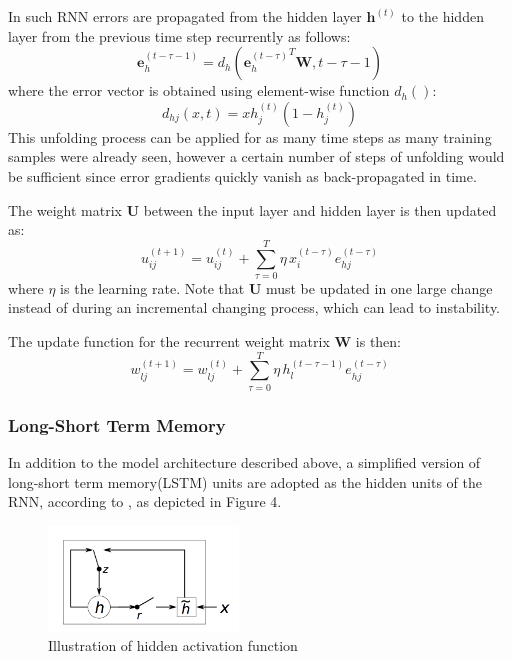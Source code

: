 \documentclass[11pt,letterpaper]{article}
\begin{document}
In such RNN errors are propagated from the hidden layer $\mathbf{h}^{(t)}$ to the hidden layer from the previous time step recurrently as follows:
\begin{equation}
\mathbf{e}_h^{(t-\tau-1)} = d_h ({\mathbf{e}_h^{(t-\tau)}}^{T} \mathbf{W}, t-\tau-1)
\end{equation}
where the error vector is obtained using element-wise function $d_h()$:
\begin{equation}
d_{hj}(x, t) = x h_j^{(t)} (1- h_j^{(t)})
\end{equation}
This unfolding process can be applied for as many time steps as many training samples were already seen, however a certain number of steps of unfolding would be sufficient since error gradients quickly vanish as back-propagated in time.

The weight matrix $\mathbf{U}$ between the input layer and hidden layer is then updated as:
\begin{equation}
u_{ij}^{(t+1)} = u_{ij}^{(t)} + \sum\limits_{\tau=0}^T \eta \, x_i^{(t-\tau)} e_{hj}^{(t-\tau)}
\end{equation}
where $\eta$ is the learning rate. Note that $\mathbf{U}$ must be updated in one large change instead of during an incremental changing process, which can lead to instability. 

The update function for the recurrent weight matrix $\mathbf{W}$ is then:
\begin{equation}
w_{lj}^{(t+1)} = w_{lj}^{(t)} + \sum\limits_{\tau=0}^T  \eta \, h_l^{(t-\tau-1)} e_{hj}^{(t-\tau)}
\end{equation}

\subsubsection{Long-Short Term Memory}
In addition to the model architecture described above, a simplified version of long-short term memory(LSTM) units are adopted as the hidden units of the RNN, according to \cite{rnn}, as depicted in Figure 4.
\begin{figure}[ht]
  \centering
    \includegraphics[width=0.45\textwidth]{lstm.png}
    \caption{Illustration of hidden activation function}
\end{figure}
\end{document}
